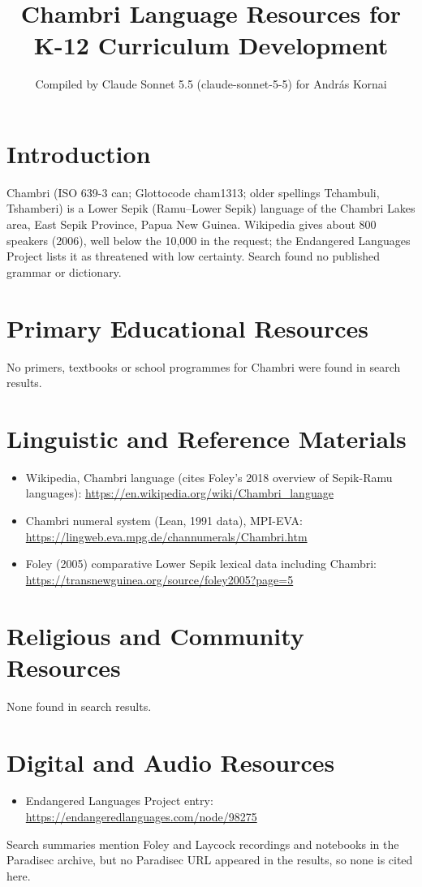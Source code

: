 \documentclass[12pt]{article}
\title{Chambri Language Resources for K-12 Curriculum Development}
\author{Compiled by Claude Sonnet 5.5 (claude-sonnet-5-5) for Andr\'as Kornai}
\date{}
\begin{document}
\maketitle

\section{Introduction}
Chambri (ISO 639-3 can; Glottocode cham1313; older spellings Tchambuli, Tshamberi) is a Lower Sepik (Ramu--Lower Sepik) language of the Chambri Lakes area, East Sepik Province, Papua New Guinea. Wikipedia gives about 800 speakers (2006), well below the 10,000 in the request; the Endangered Languages Project lists it as threatened with low certainty. Search found no published grammar or dictionary.

\section{Primary Educational Resources}
No primers, textbooks or school programmes for Chambri were found in search results.

\section{Linguistic and Reference Materials}
\begin{itemize}
\item Wikipedia, Chambri language (cites Foley's 2018 overview of Sepik-Ramu languages): \url{https://en.wikipedia.org/wiki/Chambri_language}
\item Chambri numeral system (Lean, 1991 data), MPI-EVA: \url{https://lingweb.eva.mpg.de/channumerals/Chambri.htm}
\item Foley (2005) comparative Lower Sepik lexical data including Chambri: \url{https://transnewguinea.org/source/foley2005?page=5}
\end{itemize}

\section{Religious and Community Resources}
None found in search results.

\section{Digital and Audio Resources}
\begin{itemize}
\item Endangered Languages Project entry: \url{https://endangeredlanguages.com/node/98275}
\end{itemize}
Search summaries mention Foley and Laycock recordings and notebooks in the Paradisec archive, but no Paradisec URL appeared in the results, so none is cited here.
\end{document}
